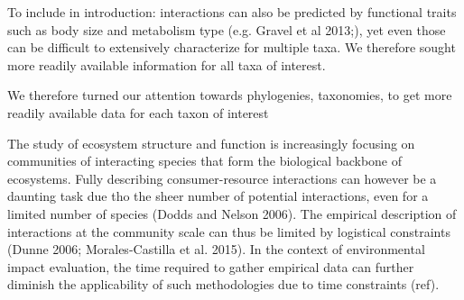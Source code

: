 \documentclass[letterpaper]{article}
\begin{document}
%
%
%
%
%






To include in introduction: interactions can also be predicted by functional traits such as body size and metabolism type (e.g. Gravel et al 2013;), yet even those can be difficult to extensively characterize for multiple taxa. We therefore sought more readily available information for all taxa of interest.

We therefore turned our attention towards phylogenies, taxonomies, to get more readily available data for each taxon of interest


The study of ecosystem structure and function is increasingly focusing on communities of interacting species that form the biological backbone of ecosystems. Fully describing consumer-resource interactions can however be a daunting task due tho the sheer number of potential interactions, even for a limited number of species (Dodds and Nelson 2006). The empirical description of interactions at the community scale can thus be limited by logistical constraints (Dunne 2006; Morales-Castilla et al. 2015). In the context of environmental impact evaluation, the time required to gather empirical data can further diminish the applicability of such methodologies due to time constraints (ref).
\end{document}
